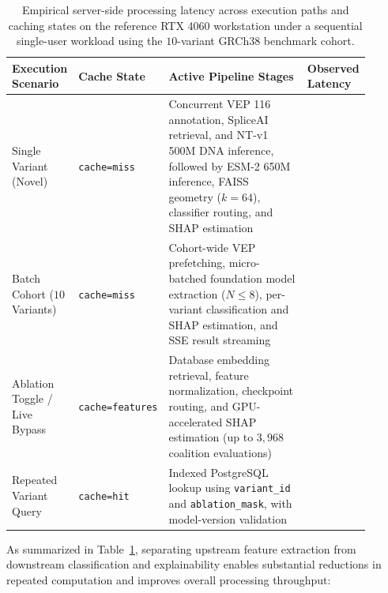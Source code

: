 \begin{table}[htbp]
    \centering
    \caption{Empirical server-side processing latency across execution paths and caching states on the reference RTX 4060 workstation under a sequential single-user workload using the $10$-variant GRCh38 benchmark cohort.}
    \label{tab:latency_benchmarks}
    \small
    \setlength{\tabcolsep}{4pt}
    \begin{tabular}{p{0.18\linewidth}p{0.20\linewidth}p{0.42\linewidth}p{0.10\linewidth}}
        \toprule
        \raggedright\textbf{Execution Scenario} & \raggedright\textbf{Cache State} & \raggedright\textbf{Active Pipeline Stages} & \raggedright\textbf{Observed Latency} \tabularnewline
        \midrule
        \raggedright Single Variant (Novel) & \texttt{cache=miss} & \raggedright Concurrent VEP 116 annotation, SpliceAI retrieval, and NT-v1 500M DNA inference, followed by ESM-2 650M inference, FAISS geometry ($k=64$), classifier routing, and SHAP estimation & \tbd{} \tabularnewline
        \addlinespace
        \raggedright Batch Cohort ($10$ Variants) & \texttt{cache=miss} & \raggedright Cohort-wide VEP prefetching, micro-batched foundation model extraction ($N \le 8$), per-variant classification and SHAP estimation, and SSE result streaming & \tbd{} \tabularnewline
        \addlinespace
        \raggedright Ablation Toggle / Live Bypass & \texttt{cache=features} & \raggedright Database embedding retrieval, feature normalization, checkpoint routing, and GPU-accelerated SHAP estimation (up to $3{,}968$ coalition evaluations) & \tbd{} \tabularnewline
        \addlinespace
        \raggedright Repeated Variant Query & \texttt{cache=hit} & \raggedright Indexed PostgreSQL lookup using \texttt{variant\_id} and \texttt{ablation\_mask}, with model-version validation & \tbd{} \tabularnewline
        \bottomrule
    \end{tabular}
\end{table}

As summarized in Table~\ref{tab:latency_benchmarks}, separating upstream feature extraction from downstream classification and explainability enables substantial reductions in repeated computation and improves overall processing throughput:


